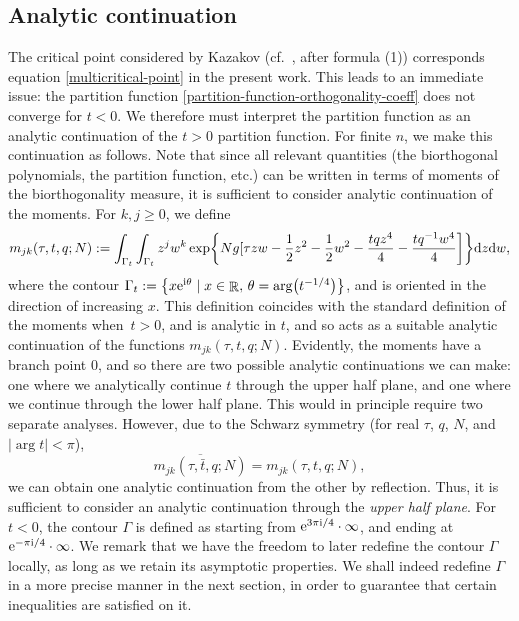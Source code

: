 \documentclass[10pt,a4paper]{amsart}
\DeclareMathOperator{\RR}{\mathbb{R}}
\numberwithin{equation}{section}
\begin{document}
\subsection{Analytic continuation}
The critical point considered by Kazakov (cf.~\cite{Kazakov3}, after formula (1)) corresponds equation \eqref{multicritical-point} in the present work.
This leads to an immediate issue: the partition function \eqref{partition-function-orthogonality-coeff} does not converge for $t<0$. We therefore must interpret the partition function as an analytic continuation of the $t>0$ partition function. For finite $n$, we make this continuation as follows. Note that since all relevant quantities (the biorthogonal polynomials, the partition function, etc.) can be written in terms of moments of the biorthogonality measure, it is sufficient to consider
analytic continuation of the moments. For $k,j\geq 0$, we define
 \begin{gather*}
 m_{jk}(\tau,t,q;N) := \int_{\Gamma_{t}}\int_{\Gamma_{t}} z^{j}w^{k}\exp\biggl\{Ng[\tau zw - \frac{1}{2}z^2 - \frac{1}{2}w^2 - \frac{tqz^4}{4} - \frac{tq^{-1}w^4}{4}\biggr]\biggr\}{\rm d}z{\rm d}w,
 \end{gather*}
where the contour $\Gamma_t := \bigl\{x {\rm e}^{{\rm i}\theta}\mid x\in \RR,\, \theta = \arg \bigl(t^{-1/4}\bigr)\bigr\}$, and is oriented in the direction of increasing $x$. This definition coincides with the standard definition of the moments when~${t>0}$, and is analytic in $t$, and so acts as
a suitable analytic continuation of the functions $m_{jk}(\tau,t,q;N)$. Evidently, the moments have a branch point $0$, and so there are
two possible analytic continuations we can make: one where we analytically continue $t$ through the upper half plane, and one where we
continue through the lower half plane. This would in principle require two separate analyses. However, due to the Schwarz symmetry (for real $\tau$, $q$, $N$,
and $|{\arg t}| < \pi$),
 \begin{equation*}%
 \overline{m_{jk}(\tau,\bar{t},q;N)} = m_{jk}(\tau,t,q;N),
 \end{equation*}
we can obtain one analytic continuation from the other by reflection. Thus, it is sufficient to consider an analytic continuation through
the \textit{upper half plane}. For $t<0$, the contour $\Gamma$ is defined as starting from ${\rm e}^{3\pi {\rm i}/4}\cdot \infty$, and ending at
${\rm e}^{-\pi {\rm i}/4}\cdot\infty$. We remark that we have the freedom to later redefine the contour $\Gamma$ locally, as long as we retain its
asymptotic properties. We shall indeed redefine $\Gamma$ in a more precise manner in the next section, in order to guarantee that certain inequalities are satisfied on it.
\end{document}
